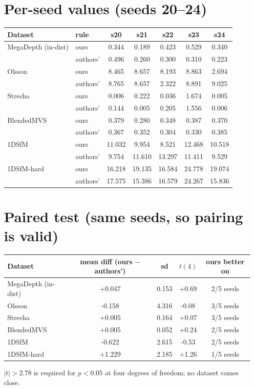 \documentclass[11pt]{article}
\begin{document}
\section*{Per-seed values (seeds 20--24)}
\begin{center}\begin{tabular}{llccccc}
\toprule
Dataset & rule & s20 & s21 & s22 & s23 & s24\\
\midrule
MegaDepth (in-dist) & ours & 0.344 & 0.189 & 0.423 & 0.529 & 0.340\\
 & authors' & 0.496 & 0.260 & 0.300 & 0.310 & 0.223\\[2pt]
Olsson & ours & 8.465 & 8.657 & 8.193 & 8.863 & 2.694\\
 & authors' & 8.765 & 8.657 & 2.322 & 8.891 & 9.025\\[2pt]
Strecha & ours & 0.006 & 0.222 & 0.036 & 1.674 & 0.005\\
 & authors' & 0.144 & 0.005 & 0.205 & 1.556 & 0.006\\[2pt]
BlendedMVS & ours & 0.379 & 0.280 & 0.348 & 0.387 & 0.370\\
 & authors' & 0.367 & 0.352 & 0.304 & 0.330 & 0.385\\[2pt]
1DSfM & ours & 11.032 & 9.954 & 8.521 & 12.468 & 10.518\\
 & authors' & 9.754 & 11.610 & 13.297 & 11.411 & 9.529\\[2pt]
1DSfM-hard & ours & 16.218 & 19.135 & 16.584 & 24.778 & 19.074\\
 & authors' & 17.575 & 15.386 & 16.579 & 24.267 & 15.836\\[2pt]
\bottomrule\end{tabular}\end{center}
\section*{Paired test (same seeds, so pairing is valid)}
\begin{center}\begin{tabular}{lcccc}
\toprule
Dataset & mean diff (ours $-$ authors') & sd & $t(4)$ & ours better on\\
\midrule
MegaDepth (in-dist) & +0.047 & 0.153 & +0.69 & 2/5 seeds\\
Olsson & -0.158 & 4.316 & -0.08 & 3/5 seeds\\
Strecha & +0.005 & 0.164 & +0.07 & 3/5 seeds\\
BlendedMVS & +0.005 & 0.052 & +0.24 & 2/5 seeds\\
1DSfM & -0.622 & 2.615 & -0.53 & 2/5 seeds\\
1DSfM-hard & +1.229 & 2.185 & +1.26 & 1/5 seeds\\
\bottomrule\end{tabular}\end{center}
\noindent$|t|>2.78$ is required for $p<0.05$ at four degrees of freedom; no dataset comes close.
\end{document}
